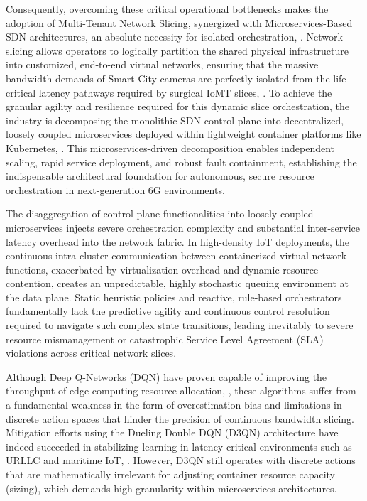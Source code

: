 \documentclass[conference]{IEEEtran}
\begin{document}
Consequently, overcoming these critical operational bottlenecks makes the adoption of Multi-Tenant Network Slicing, synergized with Microservices-Based SDN architectures, an absolute necessity for isolated orchestration\cite{b8}, \cite{b9}. Network slicing allows operators to logically partition the shared physical infrastructure into customized, end-to-end virtual networks, ensuring that the massive bandwidth demands of Smart City cameras are perfectly isolated from the life-critical latency pathways required by surgical IoMT slices\cite{b1}, \cite{b2}. To achieve the granular agility and resilience required for this dynamic slice orchestration, the industry is decomposing the monolithic SDN control plane into decentralized, loosely coupled microservices deployed within lightweight container platforms like Kubernetes\cite{b8}, \cite{b10}. This microservices-driven decomposition enables independent scaling, rapid service deployment, and robust fault containment, establishing the indispensable architectural foundation for autonomous, secure resource orchestration in next-generation 6G environments\cite{b8}.

The disaggregation of control plane functionalities into loosely coupled microservices injects severe orchestration complexity and substantial inter-service latency overhead into the network fabric\cite{b11}. In high-density IoT deployments, the continuous intra-cluster communication between containerized virtual network functions, exacerbated by virtualization overhead and dynamic resource contention, creates an unpredictable, highly stochastic queuing environment at the data plane\cite{b12}. Static heuristic policies and reactive, rule-based orchestrators fundamentally lack the predictive agility and continuous control resolution required to navigate such complex state transitions, leading inevitably to severe resource mismanagement or catastrophic Service Level Agreement (SLA) violations across critical network slices\cite{b13}.

Although Deep Q-Networks (DQN) have proven capable of improving the throughput of edge computing resource allocation\cite{b14}, \cite{b15}, these algorithms suffer from a fundamental weakness in the form of overestimation bias and limitations in discrete action spaces that hinder the precision of continuous bandwidth slicing. Mitigation efforts using the Dueling Double DQN (D3QN) architecture have indeed succeeded in stabilizing learning in latency-critical environments such as URLLC and maritime IoT\cite{b13}, \cite{b16}. However, D3QN still operates with discrete actions that are mathematically irrelevant for adjusting container resource capacity (sizing), which demands high granularity within microservices architectures.
\end{document}
